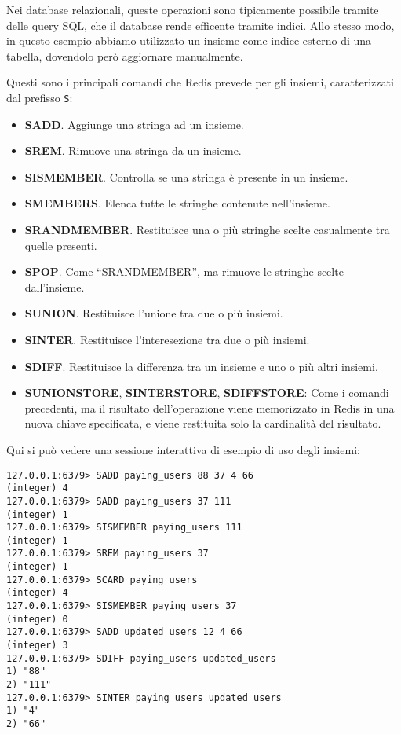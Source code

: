 Nei database relazionali, queste operazioni sono tipicamente possibile tramite delle query SQL, che il database
rende efficente tramite indici. Allo stesso modo, in questo esempio abbiamo utilizzato un insieme come indice 
esterno di una tabella, dovendolo però aggiornare manualmente. 

Questi sono i principali comandi che Redis prevede per gli insiemi, caratterizzati dal prefisso \verb|S|:

\begin{itemize}
	\medskip
	\item \textbf{SADD}. Aggiunge una stringa ad un insieme.
	\item \textbf{SREM}. Rimuove una stringa da un insieme.
	\item \textbf{SISMEMBER}. Controlla se una stringa è presente in un insieme.
	\item \textbf{SMEMBERS}. Elenca tutte le stringhe contenute nell'insieme.
	\item \textbf{SRANDMEMBER}. Restituisce una o più stringhe scelte casualmente tra quelle presenti.
	\item \textbf{SPOP}. Come ``SRANDMEMBER'', ma rimuove le stringhe scelte dall'insieme.
	\item \textbf{SUNION}. Restituisce l'unione tra due o più insiemi.
	\item \textbf{SINTER}. Restituisce l'interesezione tra due o più insiemi.
	\item \textbf{SDIFF}. Restituisce la differenza tra un insieme e uno o più altri insiemi.
	\item \textbf{SUNIONSTORE}, \textbf{SINTERSTORE}, \textbf{SDIFFSTORE}: Come i comandi precedenti, ma il risultato
	dell'operazione viene memorizzato in Redis in una nuova chiave specificata, e viene restituita solo la cardinalità
	del risultato.
\end{itemize}

Qui si può vedere una sessione interattiva di esempio di uso degli insiemi:

\medskip
\begin{lstlisting}
127.0.0.1:6379> SADD paying_users 88 37 4 66
(integer) 4
127.0.0.1:6379> SADD paying_users 37 111
(integer) 1
127.0.0.1:6379> SISMEMBER paying_users 111
(integer) 1
127.0.0.1:6379> SREM paying_users 37
(integer) 1
127.0.0.1:6379> SCARD paying_users
(integer) 4
127.0.0.1:6379> SISMEMBER paying_users 37
(integer) 0
127.0.0.1:6379> SADD updated_users 12 4 66
(integer) 3
127.0.0.1:6379> SDIFF paying_users updated_users
1) "88"
2) "111"
127.0.0.1:6379> SINTER paying_users updated_users
1) "4"
2) "66"
\end{lstlisting}


